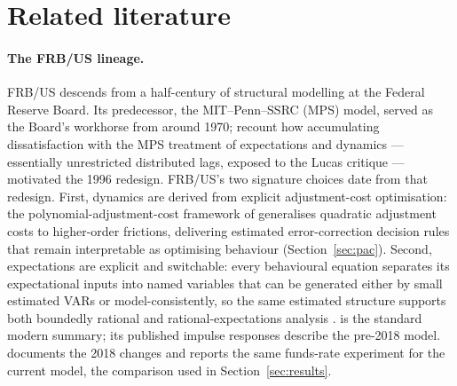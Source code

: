 \section{Related literature}
\label{sec:literature}

\paragraph{The FRB/US lineage.} FRB/US descends from a half-century of structural modelling at the Federal Reserve Board. Its predecessor, the MIT--Penn--SSRC (MPS) model, served as the Board's workhorse from around 1970; \citet{brayton1997evolution} recount how accumulating dissatisfaction with the MPS treatment of expectations and dynamics --- essentially unrestricted distributed lags, exposed to the Lucas critique --- motivated the 1996 redesign. FRB/US's two signature choices date from that redesign. First, dynamics are derived from explicit adjustment-cost optimisation: the polynomial-adjustment-cost framework of \citet{tinsley1993, tinsley2002} generalises quadratic adjustment costs to higher-order frictions, delivering estimated error-correction decision rules that remain interpretable as optimising behaviour (Section~\ref{sec:pac}). Second, expectations are explicit and switchable: every behavioural equation separates its expectational inputs into named variables that can be generated either by small estimated VARs or model-consistently, so the same estimated structure supports both boundedly rational and rational-expectations analysis \citep{brayton1997role}. \citet{brayton2014note} is the standard modern summary; its published impulse responses describe the pre-2018 model. \citet{laforte2018changes} documents the 2018 changes and reports the same funds-rate experiment for the current model, the comparison used in Section~\ref{sec:results}.

